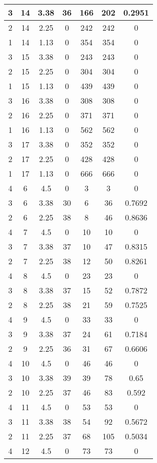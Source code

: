 \documentclass[letterpaper, 12pt]{article}
\begin{document}
\begin{longtable}{|c|c|c|c|c|c|c|}
\hline
3 & 14 & 3.38 & 36 & 166 & 202 & 0.2951 \\
\hline
2 & 14 & 2.25 & 0 & 242 & 242 & 0 \\
\hline
1 & 14 & 1.13 & 0 & 354 & 354 & 0 \\
\hline
3 & 15 & 3.38 & 0 & 243 & 243 & 0 \\
\hline
2 & 15 & 2.25 & 0 & 304 & 304 & 0 \\
\hline
1 & 15 & 1.13 & 0 & 439 & 439 & 0 \\
\hline
3 & 16 & 3.38 & 0 & 308 & 308 & 0 \\
\hline
2 & 16 & 2.25 & 0 & 371 & 371 & 0 \\
\hline
1 & 16 & 1.13 & 0 & 562 & 562 & 0 \\
\hline
3 & 17 & 3.38 & 0 & 352 & 352 & 0 \\
\hline
2 & 17 & 2.25 & 0 & 428 & 428 & 0 \\
\hline
1 & 17 & 1.13 & 0 & 666 & 666 & 0 \\
\hline
4 & 6 & 4.5 & 0 & 3 & 3 & 0 \\
\hline
3 & 6 & 3.38 & 30 & 6 & 36 & 0.7692 \\
\hline
2 & 6 & 2.25 & 38 & 8 & 46 & 0.8636 \\
\hline
4 & 7 & 4.5 & 0 & 10 & 10 & 0 \\
\hline
3 & 7 & 3.38 & 37 & 10 & 47 & 0.8315 \\
\hline
2 & 7 & 2.25 & 38 & 12 & 50 & 0.8261 \\
\hline
4 & 8 & 4.5 & 0 & 23 & 23 & 0 \\
\hline
3 & 8 & 3.38 & 37 & 15 & 52 & 0.7872 \\
\hline
2 & 8 & 2.25 & 38 & 21 & 59 & 0.7525 \\
\hline
4 & 9 & 4.5 & 0 & 33 & 33 & 0 \\
\hline
3 & 9 & 3.38 & 37 & 24 & 61 & 0.7184 \\
\hline
2 & 9 & 2.25 & 36 & 31 & 67 & 0.6606 \\
\hline
4 & 10 & 4.5 & 0 & 46 & 46 & 0 \\
\hline
3 & 10 & 3.38 & 39 & 39 & 78 & 0.65 \\
\hline
2 & 10 & 2.25 & 37 & 46 & 83 & 0.592 \\
\hline
4 & 11 & 4.5 & 0 & 53 & 53 & 0 \\
\hline
3 & 11 & 3.38 & 38 & 54 & 92 & 0.5672 \\
\hline
2 & 11 & 2.25 & 37 & 68 & 105 & 0.5034 \\
\hline
4 & 12 & 4.5 & 0 & 73 & 73 & 0 \\

\end{longtable}
\end{document}
